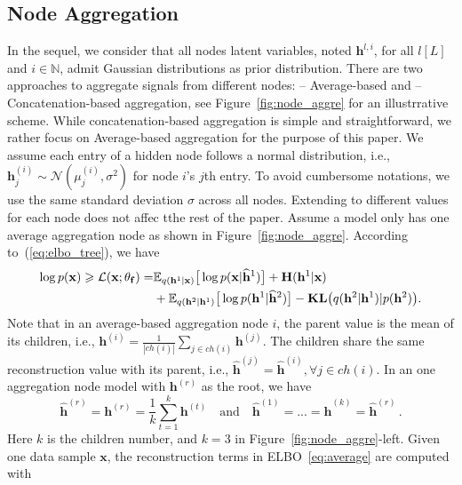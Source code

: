 \documentclass{article} %
\begin{document}
\subsection{Node Aggregation}

In the sequel, we consider that all nodes latent variables, noted $\mathbf{h}^{l, i}$, for all $l [L]$ and $i \in \mathbb{N}$, admit Gaussian distributions as prior distribution.
There are two approaches to aggregate signals from different nodes:  \textsc{--} Average-based and \textsc{--} Concatenation-based  aggregation, see Figure~\ref{fig:node_aggre} for an illustrrative scheme. 
While concatenation-based aggregation is simple and straightforward, we rather focus on Average-based aggregation for the purpose of this paper. 
We assume each entry of a hidden node follows a normal distribution, i.e., $\mathbf{h}_j^{(i)} \sim \mathcal{N}(\mu_j^{(i)}, \sigma^2)$ for node $i$'s $j$th entry. 
To avoid cumbersome notations, we  use the same standard deviation $\sigma$ across all nodes. Extending to different values for each node does not affec tthe rest of the paper.
Assume a model only has one average aggregation node as shown in Figure~\ref{fig:node_aggre}. According to~(\ref{eq:elbo_tree}), we have
\begin{align} \notag
\log p(\mathbf{x})  \geqslant \mathcal{L}(\mathbf{x}; \theta_{\mathbf{f}})
=&\mathbb{E}_{q(\mathbf{h}^1 | \mathbf{x})} \big[\log p(\mathbf{x}|\widehat{\mathbf{h}}^1)\big] + \mathbf{H}(\mathbf{h}^1 | \mathbf{x})  \\ \label{eq:average}
&+\mathbb{E}_{q(\mathbf{h}^2 | \mathbf{h}^1)} \big[\log p(\mathbf{h}^1|\widehat{\mathbf{h}}^2)\big] - \textbf{\text{KL}}\big(q(\mathbf{h}^2 | \mathbf{h}^1) | p(\mathbf{h}^2)\big).
\end{align} 
Note that in an average-based aggregation node $i$, the parent value is the mean of its children, i.e., $\mathbf{h}^{(i)} = \frac{1}{|ch(i)|} \sum_{j \in ch(i)} \mathbf{h}^{(j)}$. 
The  children  share the same reconstruction value with its parent, i.e., $\widehat{\mathbf{h}}^{(j)} = \widehat{\mathbf{h}}^{(i)}, \forall j \in ch(i)$. 
In an one aggregation node model with $\mathbf{h}^{(r)}$ as the root, we have  
$$\widehat{\mathbf{h}}^{(r)} = \mathbf{h}^{(r)} = \frac{1}{k}\sum_{t=1}^k \mathbf{h}^{(t)} \quad \textrm{and} \quad \widehat{\mathbf{h}}^{(1)} = ... = \widehat{\mathbf{h}}^{(k)}= \widehat{\mathbf{h}}^{(r)} \, .$$
Here $k$ is the children number, and $k=3$ in Figure~\ref{fig:node_aggre}-left. Given one data sample $\mathbf{x}$, the reconstruction terms in ELBO~\eqref{eq:average} are computed with 
\end{document}
